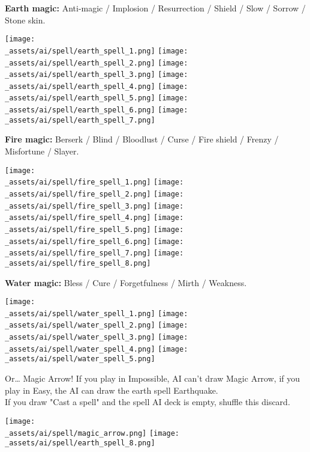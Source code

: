 \textbf{Earth magic:} Anti-magic / Implosion / Resurrection / Shield / Slow / Sorrow / Stone skin.
\begin{center}
    \texttt{[image: \\\_assets/ai/spell/earth\_spell\_1.png]}
    \texttt{[image: \\\_assets/ai/spell/earth\_spell\_2.png]}
    \texttt{[image: \\\_assets/ai/spell/earth\_spell\_3.png]}
    \texttt{[image: \\\_assets/ai/spell/earth\_spell\_4.png]}
    \texttt{[image: \\\_assets/ai/spell/earth\_spell\_5.png]}
    \texttt{[image: \\\_assets/ai/spell/earth\_spell\_6.png]}
    \texttt{[image: \\\_assets/ai/spell/earth\_spell\_7.png]}
\end{center}

\textbf{Fire magic:} Berserk / Blind / Bloodlust / Curse / Fire shield / Frenzy / Misfortune / Slayer.
\begin{center}
    \texttt{[image: \\\_assets/ai/spell/fire\_spell\_1.png]}
    \texttt{[image: \\\_assets/ai/spell/fire\_spell\_2.png]}
    \texttt{[image: \\\_assets/ai/spell/fire\_spell\_3.png]}
    \texttt{[image: \\\_assets/ai/spell/fire\_spell\_4.png]}
    \texttt{[image: \\\_assets/ai/spell/fire\_spell\_5.png]}
    \texttt{[image: \\\_assets/ai/spell/fire\_spell\_6.png]}
    \texttt{[image: \\\_assets/ai/spell/fire\_spell\_7.png]}
    \texttt{[image: \\\_assets/ai/spell/fire\_spell\_8.png]}
\end{center}

\textbf{Water magic:} Bless / Cure / Forgetfulness / Mirth / Weakness.
\begin{center}
    \texttt{[image: \\\_assets/ai/spell/water\_spell\_1.png]}
    \texttt{[image: \\\_assets/ai/spell/water\_spell\_2.png]}
    \texttt{[image: \\\_assets/ai/spell/water\_spell\_3.png]}
    \texttt{[image: \\\_assets/ai/spell/water\_spell\_4.png]}
    \texttt{[image: \\\_assets/ai/spell/water\_spell\_5.png]}
\end{center}

\begin{multicols}{2}
    Or… Magic Arrow! 
    If you play in Impossible, AI can’t draw Magic Arrow, if you play in Easy, the AI can draw the earth spell Earthquake. \\ 
    If you draw "Cast a spell" and the spell AI deck is empty, shuffle this discard.
    \columnbreak
    \begin{center}
        \texttt{[image: \\\_assets/ai/spell/magic\_arrow.png]}
        \texttt{[image: \\\_assets/ai/spell/earth\_spell\_8.png]}
    \end{center}
\end{multicols}


